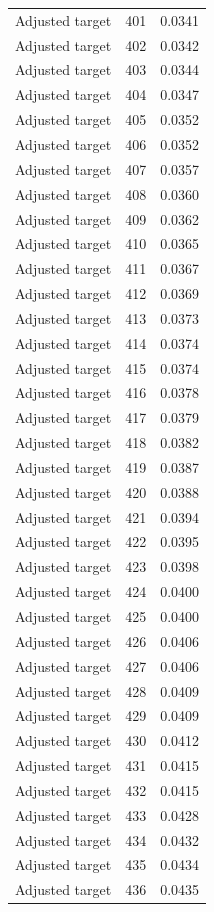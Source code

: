 \begin{table}[htbp]
\begin{tabular}{lll}
Adjusted target & 401 & 0.0341 \\
Adjusted target & 402 & 0.0342 \\
Adjusted target & 403 & 0.0344 \\
Adjusted target & 404 & 0.0347 \\
Adjusted target & 405 & 0.0352 \\
Adjusted target & 406 & 0.0352 \\
Adjusted target & 407 & 0.0357 \\
Adjusted target & 408 & 0.0360 \\
Adjusted target & 409 & 0.0362 \\
Adjusted target & 410 & 0.0365 \\
Adjusted target & 411 & 0.0367 \\
Adjusted target & 412 & 0.0369 \\
Adjusted target & 413 & 0.0373 \\
Adjusted target & 414 & 0.0374 \\
Adjusted target & 415 & 0.0374 \\
Adjusted target & 416 & 0.0378 \\
Adjusted target & 417 & 0.0379 \\
Adjusted target & 418 & 0.0382 \\
Adjusted target & 419 & 0.0387 \\
Adjusted target & 420 & 0.0388 \\
Adjusted target & 421 & 0.0394 \\
Adjusted target & 422 & 0.0395 \\
Adjusted target & 423 & 0.0398 \\
Adjusted target & 424 & 0.0400 \\
Adjusted target & 425 & 0.0400 \\
Adjusted target & 426 & 0.0406 \\
Adjusted target & 427 & 0.0406 \\
Adjusted target & 428 & 0.0409 \\
Adjusted target & 429 & 0.0409 \\
Adjusted target & 430 & 0.0412 \\
Adjusted target & 431 & 0.0415 \\
Adjusted target & 432 & 0.0415 \\
Adjusted target & 433 & 0.0428 \\
Adjusted target & 434 & 0.0432 \\
Adjusted target & 435 & 0.0434 \\
Adjusted target & 436 & 0.0435 \\

\end{tabular}
\end{table}
